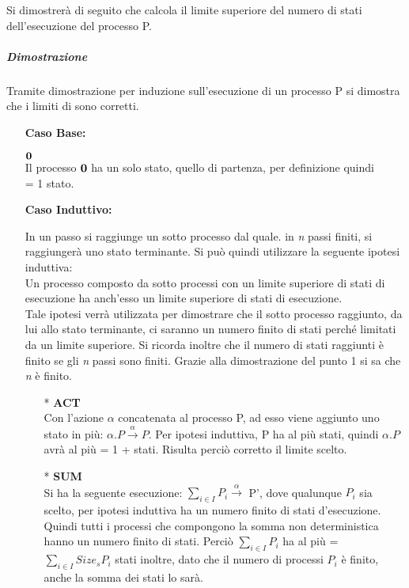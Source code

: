 Si dimostrerà di seguito che  calcola il limite superiore del numero di stati dell'esecuzione del processo P.

\subparagraph{Dimostrazione} \mbox{}

Tramite dimostrazione per induzione sull'esecuzione di un processo P si dimostra che i limiti di  sono corretti.

\begin{itemize}
	\item[] \textbf{Caso Base:} \mbox{}
	
	 $\mathbf{0}$
	\\
	Il processo $\mathbf{0}$ ha un solo stato, quello di partenza, per definizione quindi\\ \sis{\zero} = 1 stato.
		\\
	\item[] \textbf{Caso Induttivo:} \mbox{}
	
	In un passo si raggiunge un sotto processo dal quale. in \textit{n} passi finiti, si raggiungerà uno stato terminante. Si può quindi utilizzare la seguente ipotesi induttiva: \\
	Un processo composto da sotto processi con un limite superiore di stati di esecuzione ha anch'esso un limite superiore di stati di esecuzione.\\
	Tale ipotesi verrà utilizzata per dimostrare che il sotto processo raggiunto, da lui allo stato terminante, ci saranno un numero finito di stati perché limitati da un limite superiore. Si ricorda inoltre che il numero di stati raggiunti è finito se gli \textit{n} passi sono finiti. Grazie alla dimostrazione del punto 1 si sa che \textit{n} è finito. 
	\\
	\begin{itemize}
		
		\item[*] \textbf{ACT}
		\\
		Con l'azione $\alpha$ concatenata al processo P, ad esso viene aggiunto uno stato in più: $\alpha.P \overset{\alpha}\rightarrow P$. Per ipotesi induttiva, P ha al più  stati, quindi $\alpha.P$ avrà al più  = 1 +  stati. Risulta perciò corretto il limite scelto.
		\\
		\item[*] \textbf{SUM}
		\\
		Si ha la seguente esecuzione: $\displaystyle\sum_{i\in I}^{}P_{i} \overset{\alpha}\rightarrow$ P', dove qualunque $P_{i}$ sia scelto, per ipotesi induttiva ha un numero finito di stati d'esecuzione. Quindi tutti i processi che compongono la somma non deterministica hanno un numero finito di stati.
		Perciò $\displaystyle\sum_{i\in I}^{}P_{i}$ ha al più  = $\displaystyle\sum_{i\in I}^{}Size_{s}{P_{i}}$ stati inoltre, dato che il numero di processi $P_{i}$ è finito, anche la somma dei stati lo sarà.
		

\end{itemize}
\end{itemize}
